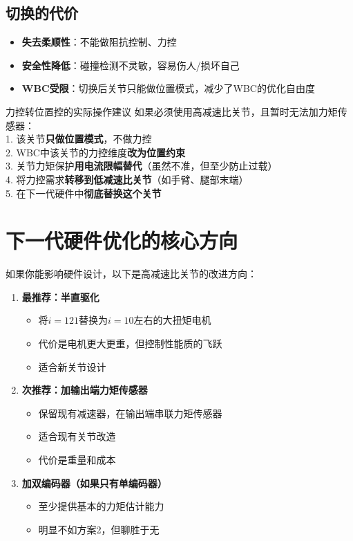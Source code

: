 \subsection{切换的代价}

\begin{itemize}
  \item \textbf{失去柔顺性}：不能做阻抗控制、力控
  \item \textbf{安全性降低}：碰撞检测不灵敏，容易伤人/损坏自己
  \item \textbf{WBC受限}：切换后关节只能做位置模式，减少了WBC的优化自由度
\end{itemize}

\begin{debugbox}{力控转位置控的实际操作建议}
如果必须使用高减速比关节，且暂时无法加力矩传感器：\\
1. 该关节\textbf{只做位置模式}，不做力控\\
2. WBC中该关节的力控维度\textbf{改为位置约束}\\
3. 关节力矩保护\textbf{用电流限幅替代}（虽然不准，但至少防止过载）\\
4. 将力控需求\textbf{转移到低减速比关节}（如手臂、腿部末端）\\
5. 在下一代硬件中\textbf{彻底替换这个关节}
\end{debugbox}

\section{下一代硬件优化的核心方向}

如果你能影响硬件设计，以下是高减速比关节的改进方向：

\begin{enumerate}
  \item \textbf{最推荐：半直驱化}
  \begin{itemize}
    \item 将$i=121$替换为$i=10$左右的大扭矩电机
    \item 代价是电机更大更重，但控制性能质的飞跃
    \item 适合新关节设计
  \end{itemize}
  \item \textbf{次推荐：加输出端力矩传感器}
  \begin{itemize}
    \item 保留现有减速器，在输出端串联力矩传感器
    \item 适合现有关节改造
    \item 代价是重量和成本
  \end{itemize}
  \item \textbf{加双编码器（如果只有单编码器）}
  \begin{itemize}
    \item 至少提供基本的力矩估计能力
    \item 明显不如方案2，但聊胜于无
  \end{itemize}
\end{enumerate}


